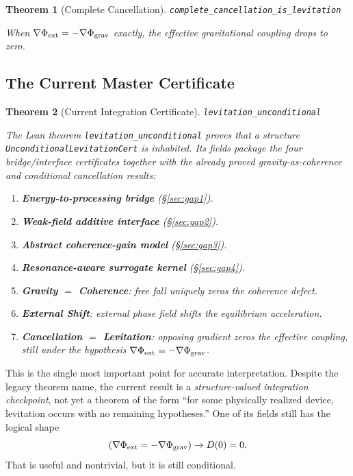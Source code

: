 \documentclass[11pt,a4paper]{article}
\newtheorem{theorem}{Theorem}[section]
\newcommand{\lean}[1]{\texttt{\small #1}}
\begin{document}
\begin{theorem}[Complete Cancellation]
\lean{complete\_cancellation\_is\_levitation}

When $\nabla\Phi_{\rm ext} = -\nabla\Phi_{\rm grav}$ exactly, the effective gravitational coupling drops to zero.
\end{theorem}

\subsection{The Current Master Certificate}

\begin{theorem}[Current Integration Certificate]
\label{thm:master}
\lean{levitation\_unconditional}

The Lean theorem \lean{levitation\_unconditional} proves that a structure
\lean{UnconditionalLevitationCert} is inhabited.
Its fields package the four bridge/interface certificates together with the already proved gravity-as-coherence and conditional cancellation results:
\begin{enumerate}[label=\textbf{G\arabic*}:]
    \item \textbf{Energy-to-processing bridge} (\S\ref{sec:gap1}).
    \item \textbf{Weak-field additive interface} (\S\ref{sec:gap2}).
    \item \textbf{Abstract coherence-gain model} (\S\ref{sec:gap3}).
    \item \textbf{Resonance-aware surrogate kernel} (\S\ref{sec:gap4}).
    \item \textbf{Gravity $=$ Coherence}: free fall uniquely zeros the coherence defect.
    \item \textbf{External Shift}: external phase field shifts the equilibrium acceleration.
    \item \textbf{Cancellation $=$ Levitation}: opposing gradient zeros the effective coupling, still under the hypothesis
    $\nabla\Phi_{\rm ext} = -\nabla\Phi_{\rm grav}$.
\end{enumerate}
\end{theorem}

\noindent This is the single most important point for accurate interpretation.
Despite the legacy theorem name, the current result is a \emph{structure-valued integration checkpoint}, not yet a theorem of the form
``for some physically realized device, levitation occurs with no remaining hypotheses.'' 
One of its fields still has the logical shape
\[
    (\nabla\Phi_{\rm ext} = -\nabla\Phi_{\rm grav}) \to D(0)=0.
\]
That is useful and nontrivial, but it is still conditional.
\end{document}
